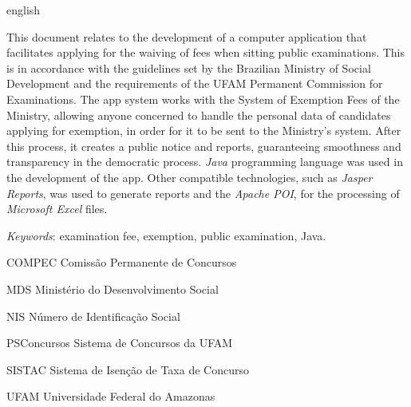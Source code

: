 \documentclass[
	12pt,			%
	openright,		%
	oneside,	
	a4paper,		%
	english,		%
	brazil			%
]{abntex2/abntex2}  %
\begin{document}
\begin{abstracteng}[Abstract]
 \begin{otherlanguage*}{english}
 	
 	This document relates to the development of a computer application that facilitates applying for the waiving of fees when sitting public examinations. This is in accordance with the guidelines set by the Brazilian Ministry of Social Development and the requirements of the UFAM Permanent Commission for Examinations. The app system works with the System of Exemption Fees of the Ministry, allowing anyone concerned to handle the personal data of candidates applying for exemption, in order for it to be sent to the Ministry's system. After this process, it creates a public notice and reports, guaranteeing smoothness and transparency in the democratic process. \textit{Java} programming language was used in the development of the app. Other compatible technologies, such as \textit{Jasper Reports}, was used to generate reports and the \textit{Apache POI}, for the processing of \textit{Microsoft Excel} files.

   \vspace{\onelineskip}
 
   \noindent 
   \textit{Keywords}: examination fee, exemption, public examination, Java.
   
 \end{otherlanguage*}
\end{abstracteng}

\listoffigures*
\cleardoublepage

\listoftables*
\cleardoublepage

\begin{siglas}
  \item[COMPEC] Comissão Permanente de Concursos
  \item[MDS] Ministério do Desenvolvimento Social
  \item[NIS] Número de Identificação Social
  \item[PSConcursos] Sistema de Concursos da UFAM
  \item[SISTAC] Sistema de Isenção de Taxa de Concurso
  \item[UFAM] Universidade Federal do Amazonas
\end{siglas}
\end{document}

